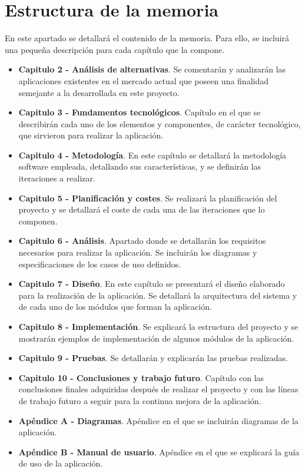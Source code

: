 \section{Estructura de la memoria}
En este apartado se detallará el contenido de la memoria. Para ello, se incluirá una pequeña descripción para cada capítulo que la compone.

\begin{itemize}
	\item \textbf{Capitulo 2 - Análisis de alternativas}. Se comentarán y analizarán las aplicaciones existentes en el mercado actual que poseen una finalidad semejante a la desarrollada en este proyecto.  
	\item \textbf{Capitulo 3 - Fundamentos tecnológicos}. Capítulo en el que se describirán cada uno de los elementos y componentes, de carácter tecnológico, que sirvieron para realizar la aplicación.
	\item \textbf{Capitulo 4 - Metodología}. En este capítulo se detallará la metodología software empleada, detallando sus características, y se definirán las iteraciones a realizar.
	\item \textbf{Capitulo 5 - Planificación y costes}. Se realizará la planificación del proyecto y se detallará el coste de cada una de las iteraciones que lo componen.
	\item \textbf{Capitulo 6 - Análisis}. Apartado donde se detallarán los requisitos necesarios para realizar la aplicación. Se incluirán los diagramas y especificaciones de los casos de uso definidos.
	\item \textbf{Capitulo 7 - Diseño}. En este capítulo se presentará el diseño elaborado para la realización de la aplicación. Se detallará la arquitectura del sistema y de cada uno de los módulos que forman la aplicación.
	\item \textbf{Capitulo 8 - Implementación}. Se explicará la estructura del proyecto y se mostrarán ejemplos de implementación de algunos módulos de la aplicación.
	\item \textbf{Capitulo 9 - Pruebas}. Se detallarán y explicarán las pruebas realizadas.
	\item \textbf{Capitulo 10 - Conclusiones y trabajo futuro}. Capítulo con las conclusiones finales adquiridas después de realizar el proyecto y con las líneas de trabajo futuro a seguir para la continua mejora de la aplicación.
	\item \textbf{Apéndice A - Diagramas}. Apéndice en el que se incluirán diagramas de la aplicación.
	\item \textbf{Apéndice B - Manual de usuario}. Apéndice en el que se explicará la guía de uso de la aplicación.
\end{itemize}

















